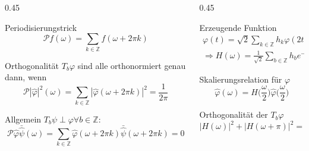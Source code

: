 %
%
%


\begin{frame}
\begin{columns}[T]
\begin{column}{0.45\hsize}
\begin{block}{Periodisierungstrick}
\vspace{-10pt}
\[
\mathcal{P}f(\omega) = \sum_{k\in\mathbb Z} f(\omega + 2\pi k)
\]
\end{block}
\vspace{-10pt}
\begin{block}{Orthogonalität}
$T_b\varphi$ sind alle orthonormiert genau dann, wenn
\[
\mathcal{P}|\hat{\varphi}|^2(\omega)
=
\sum_{k\in\mathbb Z} |\hat{\varphi}(\omega+2\pi k)|^2 = \frac{1}{2\pi}
\]
\end{block}
\vspace{-20pt}
\begin{block}{Allgemein}
$T_b \psi\perp \varphi\forall b\in\mathbb Z$:
\[
\mathcal{P}\hat{\varphi}\bar{\hat{\psi}}(\omega)
=
\sum_{k\in\mathbb Z} \hat{\varphi}(\omega + 2\pi k)\bar{\hat{\psi}}(\omega+2\pi k) = 0
\]
\end{block}
\end{column}
\begin{column}{0.45\hsize}
\begin{block}{Erzeugende Funktion}
\vspace{-15pt}
\begin{gather*}
\varphi(t) = \sqrt{2}\sum_{k\in\mathbb Z} h_k\varphi(2t-k)\\
\Rightarrow
H(\omega) = \frac1{\sqrt{2}} \sum_{b\in\mathbb Z}h_be^{-ib\omega}
\end{gather*}
\end{block}
\vspace{-10pt}
\begin{block}{Skalierungsrelation für $\varphi$}
\vspace{-10pt}
\[
\hat{\varphi}(\omega)
=
H\biggl(\frac{\omega}2\biggr)
\hat{\varphi}\biggl(\frac{\omega}2\biggr)
\]
\end{block}
\begin{block}{Orthogonalität der $T_b\varphi$}
\[
|H(\omega)|^2
+
|H(\omega+\pi)|^2
=
1
\]
\end{block}
\end{column}
\end{columns}
\end{frame}

